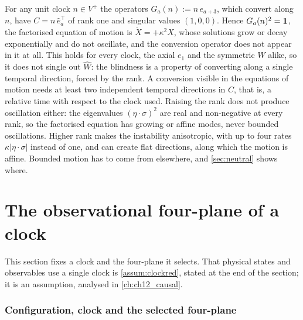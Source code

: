 \begin{example}
\label{ex:blindclock}
For any unit clock $n\in V^+$ the operators $G_a(n):=n\,e_{a+3}$, which convert along $n$, have $C=n\,\hat e_a^{\!\top}$ of rank one and singular
values $(1,0,0)$. Hence $G_a(n)^2=\mathbf 1$, the factorised equation of motion is $\ddot X=+\kappa^2X$, whose solutions grow or decay
exponentially and do not oscillate, and the conversion operator does not appear in it at all. This holds for every clock, the axial
$e_1$ and the symmetric $\widehat W$ alike, so it does not single out $\widehat W$: the blindness is a property of converting along a single
temporal direction, forced by the rank. A conversion visible in the equations of motion needs at least two independent temporal directions
in $C$, that is, a relative time with respect to the clock used. Raising the rank does not
produce oscillation either: the eigenvalues $(\eta\cdot\sigma)^2$ are real and non-negative at every rank, so the factorised equation has
growing or affine modes, never bounded oscillations. Higher rank makes the instability anisotropic, with up to four rates $\kappa|\eta\cdot\sigma|$
instead of one, and can create flat directions, along which the motion is affine. Bounded motion has to come from elsewhere, and \cref{sec:neutral} shows where.
\end{example}

\section{The observational four-plane of a clock}
\label{sec:w:theobservationalfourplan}

This section fixes a clock and the four-plane it selects. That physical states and observables use a single clock is \cref{assum:clockred}, stated at the end of the section; it is an assumption, analysed in \cref{ch:ch12_causal}.

\subsubsection{Configuration, clock and the selected four-plane}
\label{r2:sec:clock}

